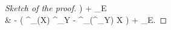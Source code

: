 \begin{proof}[Sketch of the proof]
	\mright)
	+ _E
\\
&\hspace{1cm}
	- \lambda\mleft(
		\nabla^{}_{\lambda(X)} \nabla^{}_\nu Y
		- \nabla^{}_{\lambda\mleft(\nabla^{}_\nu Y\mright)} X
	\mright)
	+ _E.
\eas
%


\end{proof}
